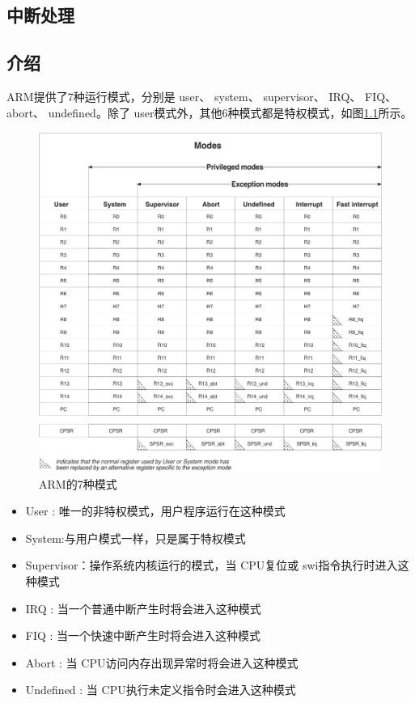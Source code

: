 \documentclass[main.tex]{subfiles}
\begin{document}
\ifxetex\else\begin{CJK*}{UTF8}{song}\fi

\chapter{中断处理}
\section{介绍}
ARM提供了7种运行模式，分别是 user、 system、 supervisor、 IRQ、 FIQ、 abort、 undefined。除了 user模式外，其他6种模式都是特权模式，如图\ref{figure:3-1}所示。

\begin{figure}[htp]
\centering
\includegraphics[scale=0.5]{figures/3-1.png}
\caption{ARM的7种模式}
\label{figure:3-1}
\end{figure}

\begin{itemize}
\item User : 唯一的非特权模式，用户程序运行在这种模式
\item System:与用户模式一样，只是属于特权模式
\item Supervisor：操作系统内核运行的模式，当 CPU复位或 swi指令执行时进入这种模式
\item IRQ :   当一个普通中断产生时将会进入这种模式
\item FIQ :   当一个快速中断产生时将会进入这种模式
\item Abort : 当 CPU访问内存出现异常时将会进入这种模式
\item Undefined : 当 CPU执行未定义指令时会进入这种模式
\end{itemize}


\end{CJK*}
\end{document}

